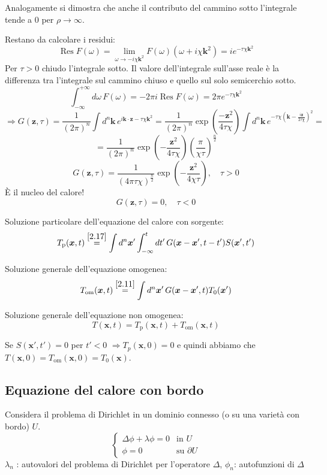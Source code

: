\documentclass[a4paper,11pt]{report}
\newcommand{\x}{\boldsymbol{x}}
\newcommand{\kk}{\boldsymbol{k}}
\newcommand{\z}{\boldsymbol{z}}
\begin{document}
Analogamente si dimostra che anche il contributo del cammino sotto l'integrale tende a 0 per $\rho\to\infty$.

\thinspace

Restano da calcolare i residui:
\[
\operatorname{Res}F(\omega)=\lim_{\omega \to -i\chi \kk^2} F(\omega) (\omega + i\chi \kk^2)=ie^{-\tau\chi \kk ^2}
\]
Per $\tau>0$ chiudo l'integrale sotto. Il valore dell'integrale sull'asse reale \`e la differenza tra l'integrale sul cammino chiuso e quello sul solo semicerchio sotto.
\[
\int_{-\infty}^{+\infty}d\omega\, F(\omega)=-2\pi i \operatorname{Res}F(\omega)=2\pi e^{-\tau\chi\kk ^2}
\]
\[
\Rightarrow G(\z,\tau)=\frac{1}{(2\pi)^n}\int d^n\kk\, e^{i\kk\cdot \z-\tau\chi\kk ^2} =\frac{1}{(2\pi)^n}\exp\left(\frac{-\z^2}{4\tau\chi}\right) \int d^n\kk \, e^{-\tau\chi\left(\kk -\frac{i\z}{2\tau\chi}\right)^2}=
\]
\[
=\frac{1}{(2\pi)^n}\exp\left(-\frac{\z^2}{4\tau\chi}\right)\left( \frac{\pi}{\chi\tau} \right)^\frac{n}{2}
\]
\begin{equation}
G(\z,\tau)=\frac{1}{(4\pi\tau\chi)^\frac{n}{2}}\exp\left(-\frac{\z^2}{4\chi\tau}\right), \quad \tau>0
\end{equation}
\`E il nucleo del calore!
\begin{equation}
G(\z,\tau)=0,\quad \tau<0
\end{equation}

Soluzione particolare dell'equazione del calore con sorgente:
\[
T_\text{p}(\x,t)\overset{\eqref{2.17}}{=}\int d^n\x'\int_{-\infty}^{t}dt'\,G(\x-\x',t-t')S(\x',t')
\]

Soluzione generale dell'equazione omogenea:
\[
T_\text{om}(\x,t)\overset{\eqref{2.11}}{=}\int d^n\x'\,G(\x-\x',t)T_0(\x')
\]

Soluzione generale dell'equazione non omogenea:
\[
T(\x,t)=T_\text{p}(\x,t)+T_\text{om}(\x,t)
\]

Se $S(\x',t')=0$ per $t'<0$ $\Rightarrow T_p(\x,0)=0$ e quindi abbiamo che $T(\x,0)=T_\text{om}(\x,0)=T_0(\x)$.

\subsection{Equazione del calore con bordo}

Considera il problema di Dirichlet in un dominio connesso (o su una variet\`a con bordo) $U$.
\[
\begin{cases}
\Delta \phi + \lambda\phi =0 & \text{in } U \\
\phi=0 & \text{su }\partial U
\end{cases}
\]
$\lambda_n$ : autovalori del problema di Dirichlet per l'operatore $\Delta$, $\phi_n$: autofunzioni di $\Delta$
\end{document}
